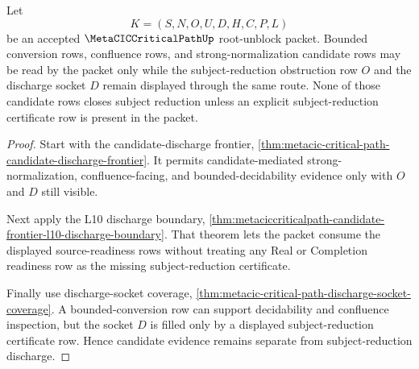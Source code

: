 \begin{theorem}
\label{thm:metaciccriticalpath-bounded-conversion-candidate-boundary}
Let
$$
K=(S,N,O,U,D,H,C,P,L)
$$
be an accepted $\MetaCICCriticalPathUp$ root-unblock packet. Bounded conversion rows, confluence rows, and strong-normalization candidate rows may be read by the packet only while the subject-reduction obstruction row $O$ and the discharge socket $D$ remain displayed through the same route. None of those candidate rows closes subject reduction unless an explicit subject-reduction certificate row is present in the packet.
\end{theorem}
\begin{proof}
Start with the candidate-discharge frontier, \autoref{thm:metacic-critical-path-candidate-discharge-frontier}. It permits candidate-mediated strong-normalization, confluence-facing, and bounded-decidability evidence only with $O$ and $D$ still visible.

Next apply the L10 discharge boundary, \autoref{thm:metaciccriticalpath-candidate-frontier-l10-discharge-boundary}. That theorem lets the packet consume the displayed source-readiness rows without treating any Real or Completion readiness row as the missing subject-reduction certificate.

Finally use discharge-socket coverage, \autoref{thm:metacic-critical-path-discharge-socket-coverage}. A bounded-conversion row can support decidability and confluence inspection, but the socket $D$ is filled only by a displayed subject-reduction certificate row. Hence candidate evidence remains separate from subject-reduction discharge.
\end{proof}

